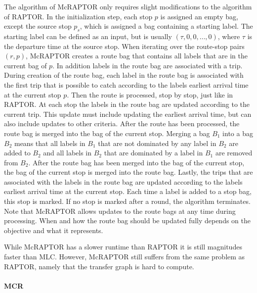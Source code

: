 The algorithm of McRAPTOR only requires slight modifications to the algorithm of RAPTOR.
In the initialization step, each stop \(p\) is assigned an empty bag, except the source stop \(p_s\), which is assigned a bag containing a starting label.
The starting label can be defined as an input, but is usually \((\tau, 0, 0, \dots, 0)\), where \(\tau\) is the departure time at the source stop.
When iterating over the route-stop pairs \((r, p)\), McRAPTOR creates a route bag that contains all labels that are in the current bag of \(p\).
In addition labels in the route bag are associated with a trip.
During creation of the route bag, each label in the route bag is associated with the first trip that is possible to catch according to the labels earliest arrival time at the current stop \(p\).
Then the route is processed, stop by stop, just like in RAPTOR.
At each stop the labels in the route bag are updated according to the current trip.
This update must include updating the earliest arrival time, but can also include updates to other criteria.
After the route has been processed, the route bag is merged into the bag of the current stop.
Merging a bag \(B_1\) into a bag \(B_2\) means that all labels in \(B_1\) that are not dominated by any label in \(B_2\) are added to \(B_2\) and all labels in \(B_2\) that are dominated by a label in \(B_1\) are removed from \(B_2\).
After the route bag has been merged into the bag of the current stop, the bag of the current stop is merged into the route bag.
Lastly, the trips that are associated with the labels in the route bag are updated according to the labels earliest arrival time at the current stop.
Each time a label is added to a stop bag, this stop is marked.
If no stop is marked after a round, the algorithm terminates.
Note that McRAPTOR allows updates to the route bags at any time during processing.
When and how the route bag should be updated fully depends on the objective and what it represents.

While McRAPTOR has a slower runtime than RAPTOR it is still magnitudes faster than MLC.
However, McRAPTOR still suffers from the same problem as RAPTOR, namely that the transfer graph is hard to compute.


\paragraph{MCR}
\label{subsubsec:mcr}


